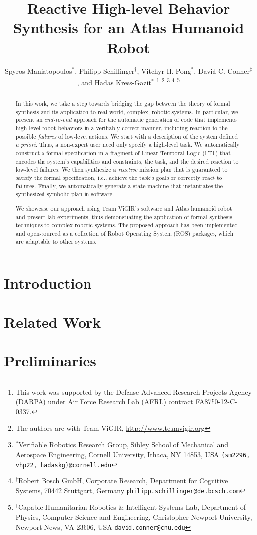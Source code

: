\documentclass[letterpaper, 10 pt, conference]{ieeeconf}	%
\title{\LARGE \bf
	Reactive High-level Behavior Synthesis for an Atlas Humanoid Robot
}
\author{Spyros Maniatopoulos$^{*}$, Philipp Schillinger$^{\dagger}$, Vitchyr H. Pong$^{*}$, David C. Conner$^{\ddagger}$, and Hadas Kress-Gazit$^{*}$%
\thanks{This work was supported by the Defense Advanced Research Projects Agency (DARPA) under Air Force Research Lab (AFRL) contract FA8750-12-C-0337.}
\thanks{The authors are with Team ViGIR, \url{http://www.teamvigir.org}}
\thanks{$^{*}$Verifiable Robotics Research Group, Sibley School of Mechanical and Aerospace Engineering, Cornell University, Ithaca, NY 14853, USA {\tt \{sm2296, vhp22, hadaskg\}\nolinkurl{@cornell.edu}}}
\thanks{$^{\dagger}$Robert Bosch GmbH, Corporate Research, Department for Cognitive Systems, 70442 Stuttgart, Germany {\tt philipp.schillinger\nolinkurl{@de.bosch.com}}}
\thanks{$^{\ddagger}$Capable Humanitarian Robotics \& Intelligent Systems Lab, Department of Physics, Computer Science and Engineering, Christopher Newport University, Newport News, VA 23606, USA {\tt david.conner\nolinkurl{@cnu.edu}}}
}%
\begin{document}
%
\maketitle
\thispagestyle{empty}
\pagestyle{empty}
%
\begin{abstract}

In this work, we take a step towards bridging the gap between the theory of formal synthesis and its application to real-world, complex, robotic systems.
In particular, we present an \emph{end-to-end} approach for the automatic generation of code that implements high-level robot behaviors in a verifiably-correct manner, including reaction to the possible \emph{failures} of low-level actions.
We start with a description of the system defined \emph{a priori}.
Thus, a non-expert user need only specify a high-level task.
We automatically construct a formal specification in a fragment of Linear Temporal Logic (\textsc{LTL}) that encodes the system's capabilities and constraints, the task, and the desired reaction to low-level failures.
We then synthesize a \emph{reactive} mission plan that is guaranteed to satisfy the formal specification, i.e., achieve the task's goals or correctly react to failures.
Finally, we automatically generate a state machine that instantiates the synthesized symbolic plan in software.

We showcase our approach using Team ViGIR's software and Atlas humanoid robot and present lab experiments, thus demonstrating the application of formal synthesis techniques to complex robotic systems.
The proposed approach has been implemented and open-sourced as a collection of Robot Operating System (ROS) packages, which are adaptable to other systems. %

\end{abstract}
%
%
%
\section{Introduction}\label{S:intro}

%
\section{Related Work}\label{S:lit}

%
\section{Preliminaries}\label{S:prelim}

%
\end{document}
